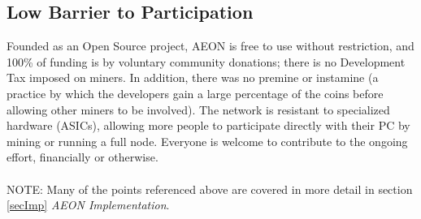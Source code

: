\subsection{Low Barrier to Participation}
Founded as an Open Source project, AEON is free to use without restriction, and 100\% of funding is by voluntary community donations; there is no Development Tax imposed on miners.  In addition, there was no premine or instamine (a practice by which the developers gain a large percentage of the coins before allowing other miners to be involved). The network is resistant to specialized hardware (ASICs), allowing more people to participate directly with their PC by mining or running a full node.  Everyone is welcome to contribute to the ongoing effort, financially or otherwise.\\
\\
NOTE:  Many of the points referenced above are covered in more detail in section \ref{secImp} \textit{AEON Implementation}.